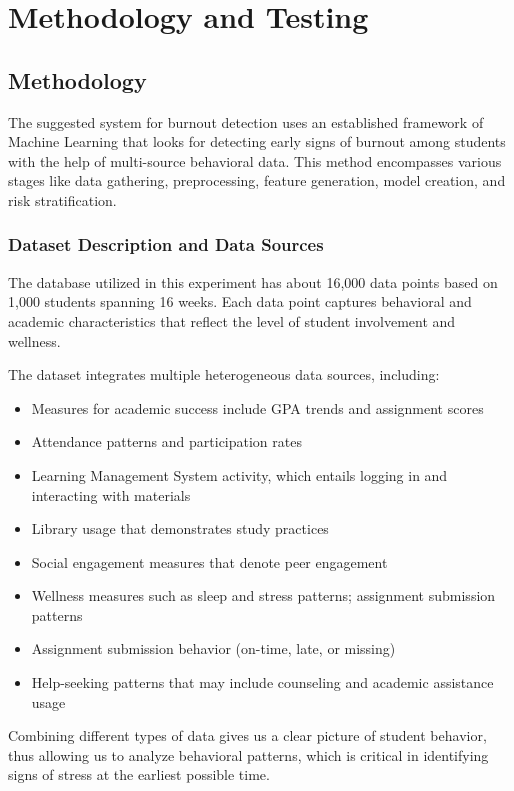 \chapter{Methodology and Testing}
\vspace{+10pt}
\section{Methodology}

The suggested system for burnout detection uses an established framework of Machine Learning that looks for detecting early signs of burnout among students with the help of multi-source behavioral data. This method encompasses various stages like data gathering, preprocessing, feature generation, model creation, and risk stratification.

\subsection{Dataset Description and Data Sources}

The database utilized in this experiment has about 16,000 data points based on 1,000 students spanning 16 weeks. Each data point captures behavioral and academic characteristics that reflect the level of student involvement and wellness.

The dataset integrates multiple heterogeneous data sources, including:
\begin{itemize}
    \item Measures for academic success include GPA trends and assignment scores
    \item Attendance patterns and participation rates
    \item Learning Management System activity, which entails logging in and interacting with materials
    \item Library usage that demonstrates study practices
    \item Social engagement measures that denote peer engagement
    \item Wellness measures such as sleep and stress patterns; assignment submission patterns
    \item Assignment submission behavior (on-time, late, or missing)
    \item Help-seeking patterns that may include counseling and academic assistance usage
\end{itemize}

Combining different types of data gives us a clear picture of student behavior, thus allowing us to analyze behavioral patterns, which is critical in identifying signs of stress at the earliest possible time.

